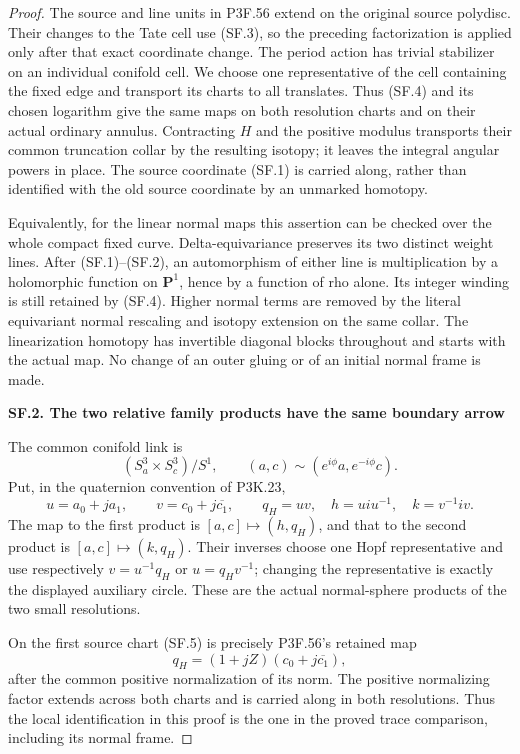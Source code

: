 \begin{proof}
The source and line units in P3F.56 extend on the original source
polydisc. Their changes to the Tate cell use (SF.3), so the preceding
factorization is applied only after that exact coordinate change.
The period action has trivial stabilizer on an individual conifold
cell. We choose one representative of the cell containing the fixed
edge and transport its charts to all translates. Thus (SF.4) and its
chosen logarithm give the same maps on both resolution charts and
on their actual ordinary annulus. Contracting \(H\) and the positive
modulus transports their common truncation collar by the resulting
isotopy; it leaves the integral angular powers in place. The source
coordinate (SF.1) is carried along, rather than identified with the
old source coordinate by an unmarked homotopy.

Equivalently, for the linear normal maps this assertion can be checked
over the whole compact fixed curve. Delta-equivariance preserves its
two distinct weight lines. After (SF.1)--(SF.2), an automorphism of
either line is multiplication by a holomorphic function on
\(\mathbf P^1\), hence by a function of rho alone. Its integer winding
is still retained by (SF.4). Higher normal terms are removed by the
literal equivariant normal rescaling and isotopy extension on the
same collar. The linearization homotopy has invertible diagonal
blocks throughout and starts with the actual map. No change of an
outer gluing or of an initial normal frame is made.

\par

\medskip\noindent\textbf{SF.2. The two relative family products have the same boundary arrow}

\par\nobreak

The common conifold link is
\[
 (S^3_a\times S^3_c)/S^1,\qquad
 (a,c)\sim(e^{i\phi}a,e^{-i\phi}c).
\]
Put, in the quaternion convention of P3K.23,
\[
 u=a_0+ja_1,\qquad v=c_0+j\overline{c_1},\qquad
 q_H=uv,\quad h=uiu^{-1},\quad k=v^{-1}iv.                 \tag{SF.5}
\]
The map to the first product is \([a,c]\mapsto(h,q_H)\), and that to
the second product is \([a,c]\mapsto(k,q_H)\). Their inverses choose
one Hopf representative and use respectively \(v=u^{-1}q_H\) or
\(u=q_Hv^{-1}\); changing the representative is exactly the displayed
auxiliary circle. These are the actual normal-sphere products of the
two small resolutions.

On the first source chart (SF.5) is precisely P3F.56's retained map
\[
              q_H=(1+jZ)(c_0+j\overline{c_1}),             \tag{SF.6}
\]
after the common positive normalization of its norm. The positive
normalizing factor extends across both charts and is carried along
in both resolutions. Thus the local identification in this proof is
the one in the proved trace comparison, including its normal frame.


\end{proof}
